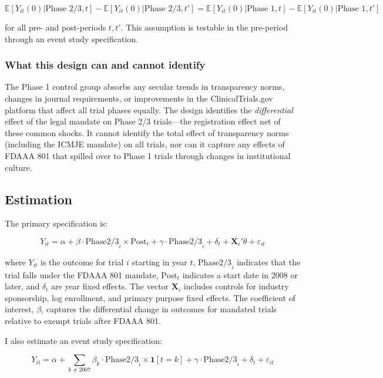 \documentclass[12pt]{article}
\newcommand{\E}{\mathbb{E}}
\begin{document}
\begin{equation}
\E[Y_{it}(0) | \text{Phase 2/3}, t] - \E[Y_{it}(0) | \text{Phase 2/3}, t'] = \E[Y_{it}(0) | \text{Phase 1}, t] - \E[Y_{it}(0) | \text{Phase 1}, t']
\end{equation}

for all pre- and post-periods $t, t'$. This assumption is testable in the pre-period through an event study specification.

\subsubsection*{What this design can and cannot identify} The Phase 1 control group absorbs any secular trends in transparency norms, changes in journal requirements, or improvements in the ClinicalTrials.gov platform that affect all trial phases equally. The design identifies the \textit{differential} effect of the legal mandate on Phase 2/3 trials---the registration effect net of these common shocks. It cannot identify the total effect of transparency norms (including the ICMJE mandate) on all trials, nor can it capture any effects of FDAAA 801 that spilled over to Phase 1 trials through changes in institutional culture.

\subsection{Estimation}

The primary specification is:

\begin{equation}
Y_{it} = \alpha + \beta \cdot \text{Phase2/3}_i \times \text{Post}_t + \gamma \cdot \text{Phase2/3}_i + \delta_t + \mathbf{X}_i'\theta + \varepsilon_{it}
\label{eq:did}
\end{equation}

where $Y_{it}$ is the outcome for trial $i$ starting in year $t$, $\text{Phase2/3}_i$ indicates that the trial falls under the FDAAA 801 mandate, $\text{Post}_t$ indicates a start date in 2008 or later, and $\delta_t$ are year fixed effects. The vector $\mathbf{X}_i$ includes controls for industry sponsorship, log enrollment, and primary purpose fixed effects. The coefficient of interest, $\beta$, captures the differential change in outcomes for mandated trials relative to exempt trials after FDAAA 801.

I also estimate an event study specification:

\begin{equation}
Y_{it} = \alpha + \sum_{k \neq 2007} \beta_k \cdot \text{Phase2/3}_i \times \mathbf{1}[t = k] + \gamma \cdot \text{Phase2/3}_i + \delta_t + \varepsilon_{it}
\label{eq:event}
\end{equation}
\end{document}
